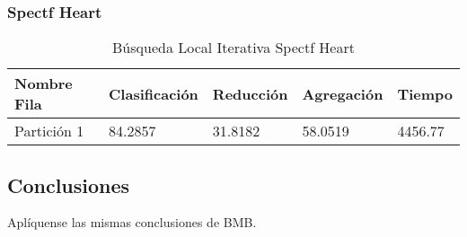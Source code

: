 \subsubsection{Spectf Heart}

\begin{table}[H]
    \centering
    \caption{Búsqueda Local Iterativa Spectf Heart}
    \begin{tabular}{|l|l|l|l|l|}
    \hline
        Nombre Fila & Clasificación & Reducción & Agregación & Tiempo \\ \hline
        Partición 1 & 84.2857  & 31.8182   &  58.0519  & 4456.77 
        \\ \hline
    \end{tabular}
    \label{ILS-Heart}
\end{table}

\subsection*{Conclusiones} 
Aplíquense las mismas conclusiones de BMB. 

